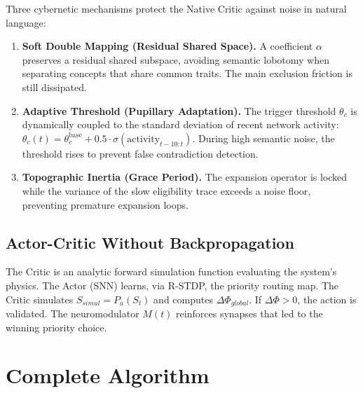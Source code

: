 \documentclass{article}
\begin{document}
Three cybernetic mechanisms protect the Native Critic against noise in natural language:

\begin{enumerate}
    \item \textbf{Soft Double Mapping (Residual Shared Space).} A coefficient $\alpha$ preserves a residual shared subspace, avoiding semantic lobotomy when separating concepts that share common traits. The main exclusion friction is still dissipated.
    \item \textbf{Adaptive Threshold (Pupillary Adaptation).} The trigger threshold $\theta_c$ is dynamically coupled to the standard deviation of recent network activity: $\theta_c(t) = \theta_c^{\text{base}} + 0.5 \cdot \sigma(\text{activity}_{t-10:t})$. During high semantic noise, the threshold rises to prevent false contradiction detection.
    \item \textbf{Topographic Inertia (Grace Period).} The expansion operator is locked while the variance of the slow eligibility trace exceeds a noise floor, preventing premature expansion loops.
\end{enumerate}

\subsection{Actor-Critic Without Backpropagation}

The Critic is an analytic forward simulation function evaluating the system's physics. The Actor (SNN) learns, via R-STDP, the priority routing map. The Critic simulates $S_{simul} = P_a(S_t)$ and computes $\Delta\Phi_{global}$. If $\Delta\Phi > 0$, the action is validated. The neuromodulator $M(t)$ reinforces synapses that led to the winning priority choice.

\section{Complete Algorithm}
\end{document}
